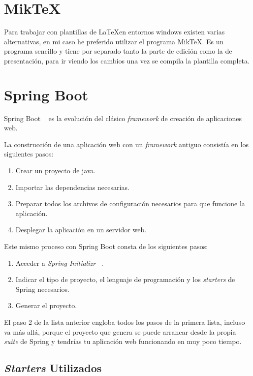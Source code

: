 \section{Mik\TeX{}}
Para trabajar con plantillas de \LaTeX  en entornos windows existen varias alternativas, en mi caso he preferido utilizar el programa Mik\TeX{}.
Es un programa sencillo y tiene por separado tanto la parte de edición como la de presentación, para ir viendo los cambios una vez se compila la plantilla completa.

\section{Spring Boot}

Spring Boot ~\cite{web:springbootArch} es la evolución del clásico \textit{framework} de creación de aplicaciones web.

La construcción de una aplicación web con un \textit{framework} antiguo consistía en los siguientes pasos:

\begin{enumerate}
	\item Crear un proyecto de java.
	\item Importar las dependencias necesarias.
	\item Preparar todos los archivos de configuración necesarios para que funcione la aplicación.
	\item Desplegar la aplicación en un servidor web.
\end{enumerate}

Este mismo proceso con Spring Boot consta de los siguientes pasos:

\begin{enumerate}
	\item Acceder a \textit{Spring Initializr} ~\cite{web:springinitializr}.
	\item Indicar el tipo de proyecto, el lenguaje de programación y los \textit{starters} \cite{web:springStarters} de Spring necesarios.
	\item Generar el proyecto.
\end{enumerate}

El paso 2 de la lista anterior engloba todos los pasos de la primera lista, incluso va más allá, porque el proyecto que genera se puede arrancar desde la propia \textit{suite} de Spring y tendrías tu aplicación web funcionando en muy poco tiempo.

\subsection{\textit{Starters} Utilizados}

